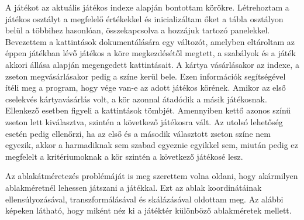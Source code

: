 A játékot az aktuális játékos indexe alapján bontottam körökre. Létrehoztam a játékos osztályt a megfelelő értékekkel és inicializáltam őket a tábla osztályon belül a többihez hasonlóan, összekapcsolva a hozzájuk tartozó panelekkel. Bevezettem a kattintások dokumentálására egy változót, amelyben eltároltam az éppen játékban lévő játékos a köre megkezdésétől megtett, a szabályok és a játék akkori állása alapján megengedett kattintásait. A kártya vásárlásakor az indexe, a zseton megvásárlásakor pedig a színe kerül bele. Ezen információk segítségével ítéli meg a program, hogy vége van-e az adott játékos körének. Amikor az első cselekvés kártyavásárlás volt, a kör azonnal átadódik a másik játékosnak. Ellenkező esetben figyeli a kattintások tömbjét. Amennyiben kettő azonos színű zseton lett kiválasztva, szintén a következő játékosra vált. Az utolsó lehetőség esetén pedig ellenőrzi, ha az első és a második választott zseton színe nem egyezik, akkor a harmadiknak sem szabad egyeznie egyikkel sem, miután pedig ez megfelelt a kritériumoknak a kör szintén a következő játékosé lesz.

Az ablakátméretezés problémáját is meg szerettem volna oldani, hogy akármilyen ablakméretnél lehessen játszani a játékkal. Ezt az ablak koordinátáinak ellensúlyozásával, transzformálásával és skálázásával oldottam meg. Az alábbi képeken látható, hogy miként néz ki a játéktér különböző ablakméretek mellett.

